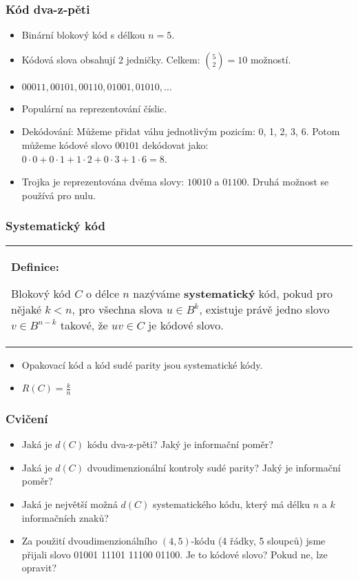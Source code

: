 \documentclass{beamer}
\newenvironment{definice}
{
    \begin{center}
    \begin{tabular}{p{9cm}}
    \textbf{Definice:}
}
{
    \end{tabular}
    \end{center}
}
\newenvironment{itemizex}%
  {\large \begin{itemize}%
    \setlength{\itemsep}{8pt}%
    \setlength{\parskip}{8pt}}%
  {\end{itemize}}
\newenvironment{itemize4}%
  {\large \begin{itemize}%
    \setlength{\itemsep}{4pt}%
    \setlength{\parskip}{4pt}}%
  {\end{itemize}}
\begin{document}
\begin{frame}[t,fragile]\frametitle{Kód dva-z-pěti} 
    \begin{itemize4}
        \item Binární blokový kód s délkou $n=5$.
        \item Kódová slova obsahují 2 jedničky. Celkem: ${5\choose2}=10$ možností.
        \item $00011, 00101, 00110,01001,01010,\dots$
        \item Populární na reprezentování číslic. 
        \item Dekódování: Můžeme přidat váhu jednotlivým pozicím: 0, 1, 2, 3, 6. Potom můžeme kódové slovo $00101$ dekódovat jako: $0\cdot0+0\cdot1+1\cdot2+0\cdot3+1\cdot6=8$.
        \item Trojka je reprezentována dvěma slovy: $10010$ a $01100$. Druhá možnost se používá pro nulu. 
    \end{itemize4}
\end{frame}


\begin{frame}[t,fragile]\frametitle{Systematický kód} 
\begin{definice}
Blokový kód $C$ o délce $n$ nazýváme \textbf{systematický} kód, pokud pro nějaké $k<n$, pro všechna slova $u\in B^k$, existuje právě jedno slovo $v\in B^{n-k}$ takové, že $uv\in C$ je kódové slovo.
\end{definice}

\begin{itemizex}
    \item Opakovací kód a kód sudé parity jsou systematické kódy.
    \item $R(C)=\frac{k}{n}$
\end{itemizex}
\end{frame}

\begin{frame}[t,fragile]\frametitle{Cvičení} 
    \begin{itemizex}
        \item Jaká je $d(C)$ kódu dva-z-pěti? Jaký je informační poměr?
        \item Jaká je $d(C)$ dvoudimenzionální kontroly sudé parity? Jaký je informační poměr?
        \item Jaká je největší možná $d(C)$ systematického kódu, který má délku $n$ a $k$ informačních znaků?
        \item Za použití dvoudimenzionálního $(4,5)$-kódu (4 řádky, 5 sloupců) jsme přijali slovo 01001 11101 11100 01100. Je to kódové slovo? Pokud ne, lze opravit? 
    \end{itemizex}
\end{frame}
\end{document}

